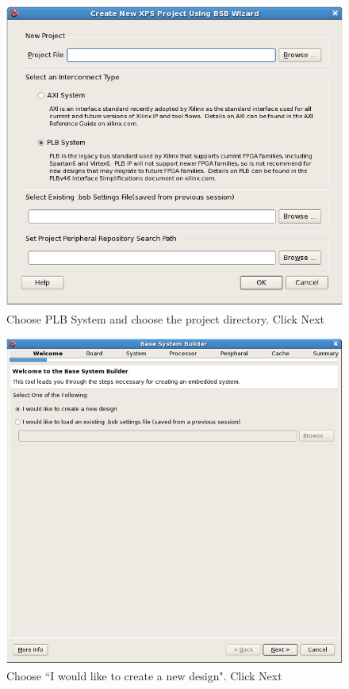 \documentclass[a4paper,oneside]{memoir}
\begin{document}
\begin{figure}[H]
\centering
\includegraphics[scale=0.4]{step1}
\caption{Choose PLB System and choose the project directory. Click Next\label{fig:step1}}
\end{figure}
\begin{figure}[H]
\centering
\includegraphics[scale=0.4]{step2}
\caption{Choose ``I would like to create a new design". Click Next\label{fig:step2}}
\end{figure}
\end{document}
